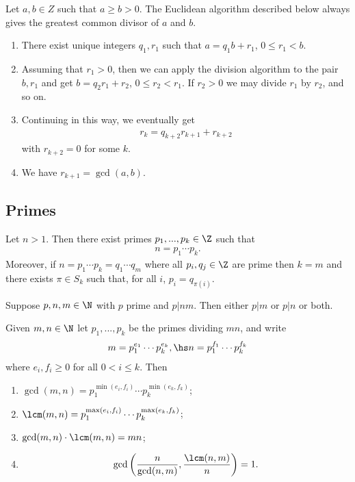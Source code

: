 \documentclass{article}
\begin{document}
\begin{theorem}
	Let $a,b\in Z$ such that $a\geq b>0$.
	The Euclidean algorithm described below always gives the greatest common divisor of
	$a$ and $b$.
	\begin{enumerate}
		\item There exist unique integers $q_1,r_1$ such that $a=q_1b+r_1$, $0\leq r_1<b$.
		\item Assuming that $r_1>0$, then we can apply the division algorithm to the pair
		      $b,r_1$ and get $b=q_2r_1 + r_2$, $0\leq r_2<r_1$. If $r_2>0$ we may divide
		      $r_1$ by $r_2$, and so on.
		\item Continuing in this way, we eventually get \begin{align*}
			      r_k=q_{k+2}r_{k+1}+r_{k+2}
		      \end{align*}
		      with $r_{k+2}=0$ for some $k$.
		\item We have $r_{k+1}=\gcd(a,b)$.
	\end{enumerate}
\end{theorem}

\subsection{Primes}

\begin{theorem}
	Let $n>1$. Then there exist primes $p_1,...,p_k\in\Z$ such that 
	\begin{align*}
		n=p_1\cdots p_k.
	\end{align*}
	Moreover, if $n=p_1\cdots p_k=q_1\cdots q_m$ where all $p_i,q_j\in\Z$ are prime 
	then $k=m$ and there exists $\pi\in S_k$ such that, for all $i$, $p_i=q_{\pi(i)}$. 
\end{theorem}

\begin{proposition}[Boocher 2.3]
	Suppose $p,n,m\in\N$ with $p$ prime and $p|nm$. Then either $p|m$ or $p|n$ or both.
\end{proposition}

\begin{proposition}[Boocher 3.2]
	Given $m,n\in\N$ let $p_1,...,p_k$ be the primes dividing $mn$, and write
	\begin{align*}
		m = p_1^{e_1}\cdots p_k^{e_k}, \hs n = p_1^{f_1}\cdots p_k^{f_k}
	\end{align*}
	where $e_i,f_i\geq 0$ for all $0<i\leq k$. Then
	\begin{enumerate}
		\item $\gcd(m,n)=p_1^{\min(e_i,f_i)}\cdots p_k^{\min(e_k,f_k)}$;
		\item $\lcm(m,n)=p_1^{\max(e_i,f_i)}\cdots p_k^{\max(e_k,f_k)}$;
		\item $\gcd(m,n)\cdot\lcm(m,n)=mn$;
		\item \begin{align*}
			      \gcd\left(\frac{n}{\gcd(n,m)},\frac{\lcm(n,m)}{n}\right)=1.
		      \end{align*}
	\end{enumerate}
\end{proposition}
\end{document}
